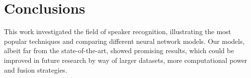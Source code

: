 \documentclass[conference]{IEEEtran}
\begin{document}

\section{Conclusions}
\label{sec:conclusions}

This work investigated the field of speaker recognition, illustrating the most popular techniques and comparing different neural network models. Our models, albeit far from the state-of-the-art, showed promising results, which could be improved in future research by way of larger datasets, more computational power and fusion strategies.



\end{document}
